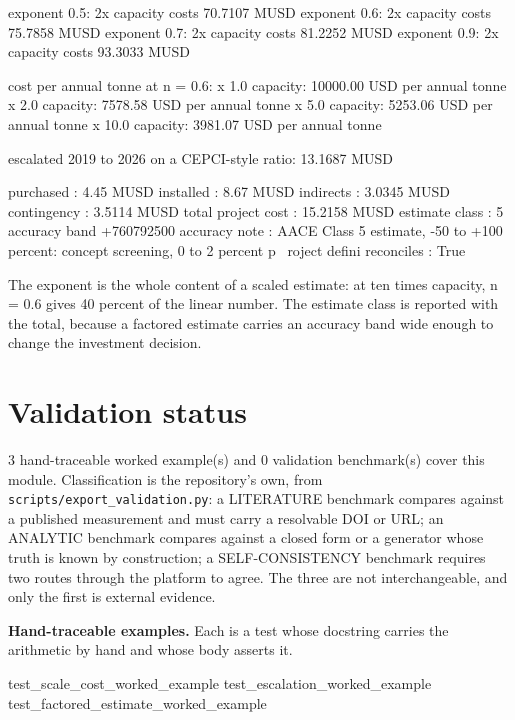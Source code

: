 \documentclass[10pt,a4paper,twoside]{report}
\begin{document}
\begin{outputblock}
exponent 0.5: 2x capacity costs   70.7107 MUSD
exponent 0.6: 2x capacity costs   75.7858 MUSD
exponent 0.7: 2x capacity costs   81.2252 MUSD
exponent 0.9: 2x capacity costs   93.3033 MUSD

cost per annual tonne at n = 0.6:
  x  1.0 capacity:   10000.00 USD per annual tonne
  x  2.0 capacity:    7578.58 USD per annual tonne
  x  5.0 capacity:    5253.06 USD per annual tonne
  x 10.0 capacity:    3981.07 USD per annual tonne

escalated 2019 to 2026 on a CEPCI-style ratio: 13.1687 MUSD

purchased               : 4.45 MUSD
installed               : 8.67 MUSD
indirects               : 3.0345 MUSD
contingency             : 3.5114 MUSD
total project cost      : 15.2158 MUSD
estimate class          : 5 accuracy band +760792500%
accuracy note           : AACE Class 5 estimate, -50 to +100 percent: concept screening, 0 to 2 percent p
    \ roject defini
reconciles              : True
\end{outputblock}

The exponent is the whole content of a scaled estimate: at ten times capacity, n = 0.6 gives 40 percent of the linear number. The estimate class is reported with the total, because a factored estimate carries an accuracy band wide enough to change the investment decision.

\section{Validation status}

3 hand-traceable worked example(s) and 0 validation benchmark(s) cover this module. Classification is the repository's own, from \texttt{scripts/export\_validation.py}: a LITERATURE benchmark compares against a published measurement and must carry a resolvable DOI or URL; an ANALYTIC benchmark compares against a closed form or a generator whose truth is known by construction; a SELF-CONSISTENCY benchmark requires two routes through the platform to agree. The three are not interchangeable, and only the first is external evidence.

\textbf{Hand-traceable examples.} Each is a test whose docstring carries the arithmetic by hand and whose body asserts it.

\begin{verbatimsmall}
test_scale_cost_worked_example
test_escalation_worked_example
test_factored_estimate_worked_example
\end{verbatimsmall}
\end{document}
